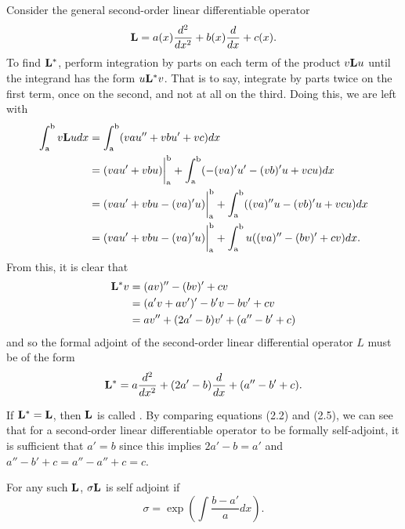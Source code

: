 \begin{example}\label{ex:selfAdjoint}
	Consider the general second-order linear differentiable operator
	\begin{equation}
		\mathrm{\bf{L}}= a(x) \frac{d^2}{dx^2} + b(x)\frac{d}{dx} + c(x).
	\end{equation}
	To find \(\mathrm{\bf{L^*}}  \), perform integration by parts on each term of the product \(v\mathrm{\bf{L}} u\) until the integrand has the form \(u \mathrm{\bf{L}}^* v\). That is to say, integrate by parts twice on the first term, once on the second, and not at all on the third. Doing this, we are left with
	\begin{equation}
		\begin{split}
			\int_\mathrm{a}^\mathrm{b} v\mathrm{\bf{L}} u dx &= \int_\mathrm{a}^\mathrm{b} (vau''+ vbu' + vc)dx\\
			&=(vau'+vbu)\biggr\rvert_\mathrm{a}^\mathrm{b} + \int_\mathrm{a}^\mathrm{b} (-(va)'u'-(vb)'u+vcu)dx\\
			&=(vau'+vbu-(va)'u)\biggr\rvert_\mathrm{a}^\mathrm{b} + \int_\mathrm{a}^\mathrm{b} ((va)''u-(vb)'u+vcu)dx\\
			&=(vau'+vbu-(va)'u)\biggr\rvert_\mathrm{a}^\mathrm{b} + \int_\mathrm{a}^\mathrm{b} u((va)''-(bv)'+cv)dx.
		\end{split}
	\end{equation}
	From this, it is clear that 
	\begin{equation}\label{eq:2OAdjoint}
		\begin{split}
			\mathrm{\bf{L^*}} v &= (av)''-(bv)'+cv\\
			     &= (a'v+av')'-b'v-bv'+cv\\
			     &= av''+(2a'-b)v'+(a''-b'+c)
		\end{split}
	\end{equation}
	and so the formal adjoint of the second-order linear differential operator \(L\) must be of the form
	\begin{equation}
		\begin{split}
			\mathrm{\bf{L^*}} =a\frac{d^2}{dx^2} + (2a'-b)\frac{d}{dx}+(a''-b'+c).
		\end{split}
	\end{equation}
	
	
	If \(\mathrm{\bf{L^*}}  = \mathrm{\bf{L}}\), then \( \mathrm{\bf{L}}\) is called . By comparing equations (2.2) and (2.5), we can see that for a second-order linear differentiable operator to be formally self-adjoint, it is sufficient that \(a'=b\) since this implies \(2a'-b=a'\) and \(a''-b'+c=a''-a''+c=c\).
\end{example}

\begin{theorem}
	For any such \(\mathrm{\bf{L}}\), \(\sigma\mathrm{\bf{L}}\) is self adjoint if
		\begin{equation}
			\sigma = \exp\left({\int \frac{b-a'}{a}dx}\right).
		\end{equation}
\end{theorem}

